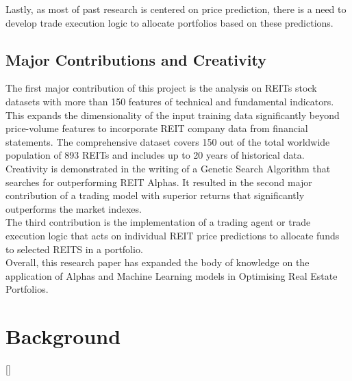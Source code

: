 \documentclass[a4paper,12pt]{report}
\renewcommand\thechapter{\Roman{chapter}}
\numberwithin{equation}{section}
\theoremstyle{definition}
\begin{document}
Lastly, as most of past research is centered on price prediction, there is a need to develop trade execution logic to allocate portfolios based on these predictions.



\section{Major Contributions and Creativity}
The first major contribution of this project is the analysis on REITs stock datasets with more than 150 features of technical and fundamental indicators. This expands the dimensionality of the input training data significantly beyond price-volume features to incorporate REIT company data from financial statements. The comprehensive dataset covers 150 out of the total worldwide population of 893 REITs and includes up to 20 years of historical data.\\

Creativity is demonstrated in the writing of a Genetic Search Algorithm that searches for outperforming REIT Alphas. It resulted in the second major contribution of a trading model with superior returns that significantly outperforms the market indexes.\\ 

The third contribution is the implementation of a trading agent or trade execution logic that acts on individual REIT price predictions to allocate funds to selected REITS in a portfolio.\\

Overall, this research paper has expanded the body of knowledge on the application of Alphas and Machine Learning models in Optimising Real Estate Portfolios.

\titleformat{\chapter}[block]
  {\normalfont\huge\bfseries}{\thechapter.}{1em}{\Huge\centering}
\titlespacing*{\chapter}{0pt}{230pt}{0pt}
\setcounter{chapter}{0}
\renewcommand{\thechapter}{\Roman{chapter}}

\chapter{Background}


\titleformat{\chapter}[display]{\Large}{\centering
  \MakeUppercase{\chaptername}\quad{\Huge\thechapter}}{10pt}{\titlerule[.5pt]\vspace{10pt}\centering
  \MakeUppercase}[\vspace{10pt}{\titlerule[.5pt]}]%
\titlespacing{\chapter}{0pt}{-80pt}{1cm}%
\renewcommand{\thechapter}{\arabic{chapter}}
\end{document}
